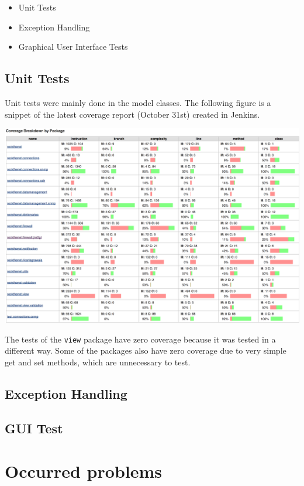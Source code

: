 \documentclass[11pt, a4paper]{article}
\begin{document}
\begin{itemize}
	\item Unit Tests
	\item Exception Handling
	\item Graphical User Interface Tests
\end{itemize}

\subsection{Unit Tests}

Unit tests were mainly done in the model classes. The following figure is a snippet of the latest coverage report (October 31st) created in Jenkins. 

\includegraphics[width=\textwidth]{images/coverage}

The tests of the \lstinline|view| package have zero coverage because it was tested in a different way. Some of the packages also have zero coverage due to very simple get and set methods, which are unnecessary to test.  

\subsection{Exception Handling}
\subsection{GUI Test}

\section{Occurred problems}
\label{sec:problems}
\end{document}
